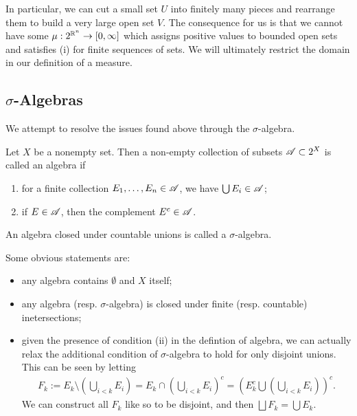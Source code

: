 \documentclass[12pt]{article} %
\begin{document}
\noindent In particular, we can cut a small set $U$ into finitely many pieces and rearrange them to build a very large open set $V$. The consequence for us is that we cannot have some $\mu : 2^{\mathbb{R}^n} \to [0,\infty]$ which assigns positive values to bounded open sets and satisfies (i) for finite sequences of sets. We will ultimately restrict the domain in our definition of a measure.

\subsection{$\sigma$-Algebras}

We attempt to resolve the issues found above through the $\sigma$-algebra.

\begin{definition}[Algebra]
    Let $X$ be a nonempty set. Then a non-empty collection of subsets $\mathscr{A} \subset 2^X$ is called an algebra if \begin{enumerate}
        \item for a finite collection $E_1, \ldots, E_n \in \mathscr{A}$, we have $\bigcup E_i \in \mathscr{A}$;
        \item if $E \in \mathscr{A}$, then the complement $E^c \in \mathscr{A}$.
    \end{enumerate}
\end{definition}

\begin{definition}
    An algebra closed under countable unions is called a $\sigma$-algebra.
\end{definition}

\begin{remark}
    Some obvious statements are: \begin{itemize}
        \item any algebra contains $\emptyset$ and $X$ itself;
        \item any algebra (resp. $\sigma$-algebra) is closed under finite (resp. countable) inetersections;
        \item given the presence of condition (ii) in the defintion of algebra, we can actually relax the additional condition of $\sigma$-algebra to hold for only disjoint unions. This can be seen by letting \begin{align*}
            F_k := E_k \setminus \left( \bigcup_{i < k} E_i \right) = E_k \cap \left( \bigcup_{i < k} E_i \right)^c = \left( E_k^c \bigcup \left( \bigcup_{i < k} E_i \right) \right)^c.
        \end{align*} We can construct all $F_k$ like so to be disjoint, and then $\bigsqcup F_k = \bigcup E_k$.
    \end{itemize}
\end{remark}
\end{document}
